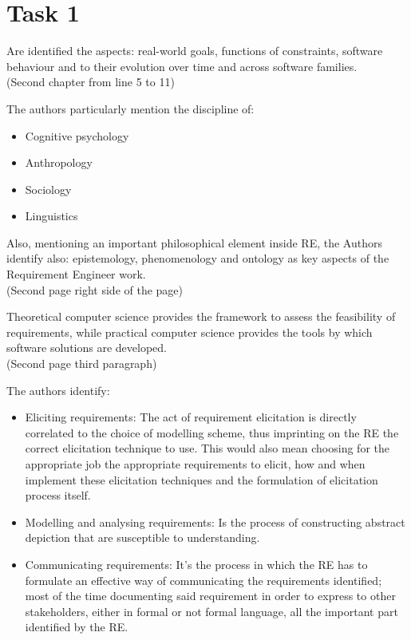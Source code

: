 \chapter{Task 1}
\begin{elenco}
	\item Are identified the aspects: real-world goals, functions of constraints, software behaviour and to their evolution over time and across software families.\\ (Second chapter from line 5 to 11)
	\item The authors particularly mention the discipline of:
	\begin{itemize}
		\item Cognitive psychology
		\item Anthropology
		\item Sociology
		\item Linguistics
	\end{itemize}
	Also, mentioning an important philosophical element inside RE, the Authors identify also: epistemology, phenomenology and ontology as key aspects of the Requirement Engineer work. \\(Second page right side of the page)
	\item Theoretical computer science provides the framework to assess the feasibility of requirements, while practical computer science provides the tools by which software solutions are developed.\\(Second page third paragraph)
	\item The authors identify:
	\begin{itemize}
		\item Eliciting requirements: The act of requirement elicitation is directly correlated to the choice of modelling scheme, thus imprinting on the RE the correct elicitation technique to use. This would also mean choosing for the appropriate job the appropriate requirements to elicit, how and when implement these elicitation techniques and the formulation of elicitation process itself.
		\item Modelling and analysing requirements: Is the process of constructing abstract depiction that are susceptible to understanding. 
		\item Communicating requirements: It's the process in which the RE has to formulate an effective way of communicating the requirements identified; most of the time documenting said requirement in order to express to other stakeholders, either in formal or not formal language, all the important part identified by the RE. 

\end{itemize}
\end{elenco}
